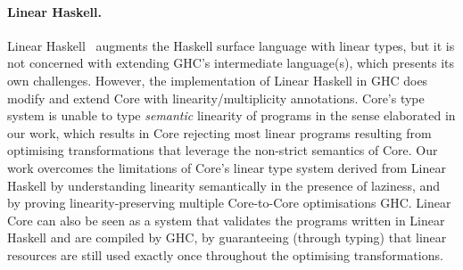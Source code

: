 \documentclass[acmsmall,review,anonymous,screen]{acmart}
\begin{document}
\paragraph{Linear Haskell\label{sec:related-work-linear-haskell}.}
%
%
Linear Haskell~\cite{cite:linearhaskell} augments the Haskell surface language
with linear types, but it is not concerned with extending GHC's intermediate
language(s), which presents its own challenges. 
%
However, the implementation of Linear Haskell in GHC does modify and extend Core
with linearity/multiplicity annotations. Core's type system is unable to type
\emph{semantic} linearity of programs in the sense elaborated in our work,
which results in Core rejecting most linear programs resulting from optimising
transformations that leverage the non-strict semantics of Core.
%
Our work overcomes the limitations of Core's linear type system derived from
Linear Haskell by understanding linearity semantically in the presence of
laziness, and by proving linearity-preserving multiple Core-to-Core
optimisations GHC.
Linear Core can also be seen as a system that validates the programs written in
Linear Haskell and are compiled by GHC, by guaranteeing (through typing) that
linear resources are still used exactly once throughout the optimising
transformations.
\end{document}
